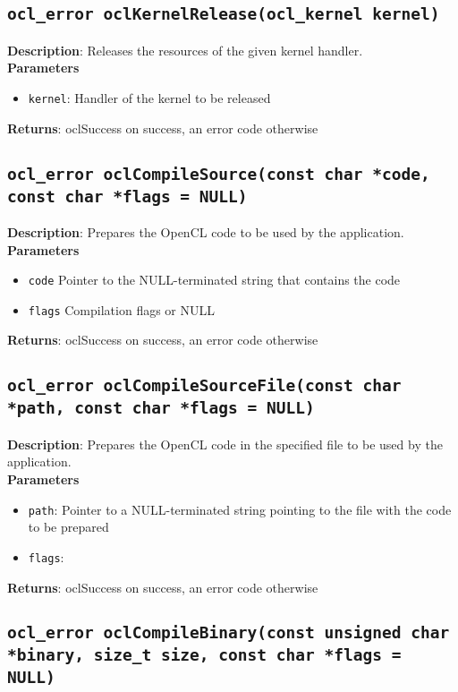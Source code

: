 \subsection{\texttt{ocl\_error oclKernelRelease(ocl\_kernel kernel)}}

\textbf{Description}: Releases the resources of the given kernel handler. \\
\textbf{Parameters}
\begin{itemize}
  \item \texttt{kernel}: Handler of the kernel to be released
\end{itemize}
\textbf{Returns}: oclSuccess on success, an error code otherwise


\subsection{\texttt{ocl\_error oclCompileSource(const char *code, const char *flags = NULL)}}

\textbf{Description}: Prepares the OpenCL code to be used by the application. \\
\textbf{Parameters}
\begin{itemize}
  \item \texttt{code} Pointer to the NULL\hyp{}terminated string that contains the code
  \item \texttt{flags} Compilation flags or NULL
\end{itemize}
\textbf{Returns}: oclSuccess on success, an error code otherwise

\subsection{\texttt{ocl\_error oclCompileSourceFile(const char *path, const char *flags = NULL)}}

\textbf{Description}: Prepares the OpenCL code in the specified file to be used by the application.  \\
\textbf{Parameters}
\begin{itemize}
  \item \texttt{path}: Pointer to a NULL\hyp{}terminated string pointing to the file with the code 
 to be prepared
  \item \texttt{flags}: \end{itemize}
\textbf{Returns}: oclSuccess on success, an error code otherwise

\subsection{\texttt{ocl\_error oclCompileBinary(const unsigned char *binary, size\_t size, const char *flags = NULL)}}

